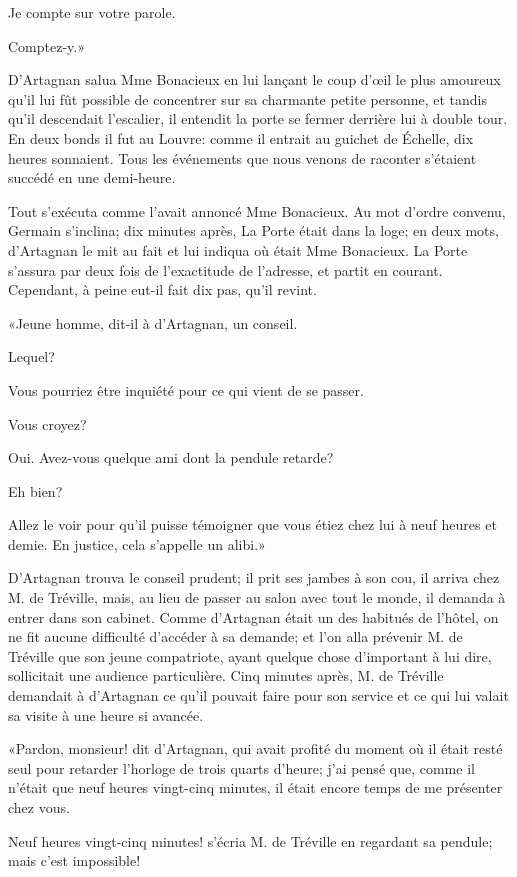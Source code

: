 \speak  Je compte sur votre parole. 

\speak  Comptez-y.» 

D'Artagnan salua Mme Bonacieux en lui lançant le coup d'œil le plus amoureux qu'il lui fût possible de concentrer sur sa charmante petite personne, et tandis qu'il descendait l'escalier, il entendit la porte se fermer derrière lui à double tour. En deux bonds il fut au Louvre: comme il entrait au guichet de Échelle, dix heures sonnaient. Tous les événements que nous venons de raconter s'étaient succédé en une demi-heure. 

Tout s'exécuta comme l'avait annoncé Mme Bonacieux. Au mot d'ordre convenu, Germain s'inclina; dix minutes après, La Porte était dans la loge; en deux mots, d'Artagnan le mit au fait et lui indiqua où était Mme Bonacieux. La Porte s'assura par deux fois de l'exactitude de l'adresse, et partit en courant. Cependant, à peine eut-il fait dix pas, qu'il revint. 

«Jeune homme, dit-il à d'Artagnan, un conseil. 

\speak  Lequel? 

\speak  Vous pourriez être inquiété pour ce qui vient de se passer. 

\speak  Vous croyez? 

\speak  Oui. Avez-vous quelque ami dont la pendule retarde? 

\speak  Eh bien? 

\speak  Allez le voir pour qu'il puisse témoigner que vous étiez chez lui à neuf heures et demie. En justice, cela s'appelle un alibi.» 

D'Artagnan trouva le conseil prudent; il prit ses jambes à son cou, il arriva chez M. de Tréville, mais, au lieu de passer au salon avec tout le monde, il demanda à entrer dans son cabinet. Comme d'Artagnan était un des habitués de l'hôtel, on ne fit aucune difficulté d'accéder à sa demande; et l'on alla prévenir M. de Tréville que son jeune compatriote, ayant quelque chose d'important à lui dire, sollicitait une audience particulière. Cinq minutes après, M. de Tréville demandait à d'Artagnan ce qu'il pouvait faire pour son service et ce qui lui valait sa visite à une heure si avancée. 

«Pardon, monsieur! dit d'Artagnan, qui avait profité du moment où il était resté seul pour retarder l'horloge de trois quarts d'heure; j'ai pensé que, comme il n'était que neuf heures vingt-cinq minutes, il était encore temps de me présenter chez vous. 

\speak  Neuf heures vingt-cinq minutes! s'écria M. de Tréville en regardant sa pendule; mais c'est impossible! 

